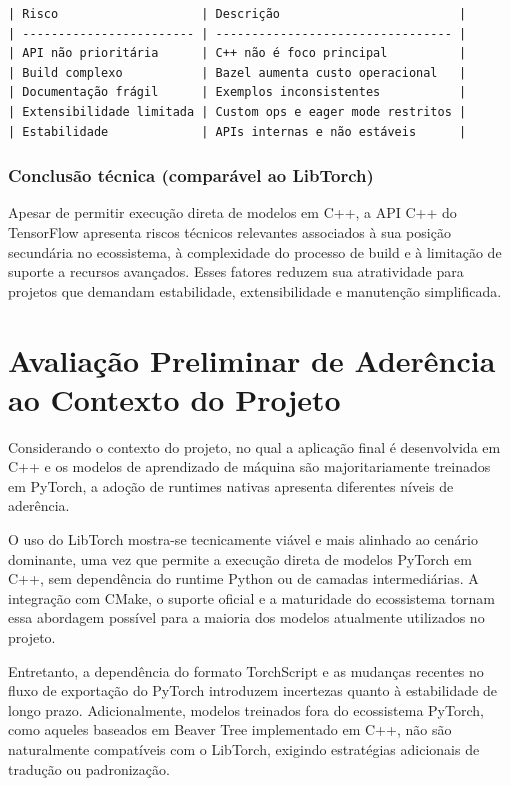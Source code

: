 \begin{verbatim}
| Risco                    | Descrição                         |
| ------------------------ | --------------------------------- |
| API não prioritária      | C++ não é foco principal          |
| Build complexo           | Bazel aumenta custo operacional   |
| Documentação frágil      | Exemplos inconsistentes           |
| Extensibilidade limitada | Custom ops e eager mode restritos |
| Estabilidade             | APIs internas e não estáveis      |

\end{verbatim}

\subsubsection{Conclusão técnica (comparável ao LibTorch)}

Apesar de permitir execução direta de modelos em C++, a API C++ do TensorFlow apresenta riscos técnicos relevantes associados à sua posição secundária no ecossistema, à complexidade do processo de build e à limitação de suporte a recursos avançados. Esses fatores reduzem sua atratividade para projetos que demandam estabilidade, extensibilidade e manutenção simplificada.





\section{Avaliação Preliminar de Aderência ao Contexto do Projeto}

Considerando o contexto do projeto, no qual a aplicação final é desenvolvida em C++ e
os modelos de aprendizado de máquina são majoritariamente treinados em PyTorch, a
adoção de runtimes nativas apresenta diferentes níveis de aderência.

O uso do LibTorch mostra-se tecnicamente viável e mais alinhado ao cenário dominante,
uma vez que permite a execução direta de modelos PyTorch em C++, sem dependência do
runtime Python ou de camadas intermediárias. A integração com CMake, o suporte oficial
e a maturidade do ecossistema tornam essa abordagem possível para a maioria dos modelos
atualmente utilizados no projeto.

Entretanto, a dependência do formato TorchScript e as mudanças recentes no fluxo de
exportação do PyTorch introduzem incertezas quanto à estabilidade de longo prazo.
Adicionalmente, modelos treinados fora do ecossistema PyTorch, como aqueles baseados
em Beaver Tree implementado em C++, não são naturalmente compatíveis com o LibTorch,
exigindo estratégias adicionais de tradução ou padronização.


